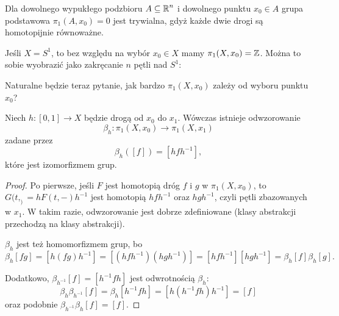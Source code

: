 \begin{example}
  \item Dla dowolnego wypukłego podzbioru $A\subseteq\operatorname{\mathbb{R}}^n$ i dowolnego punktu $x_0\in A$ grupa podstawowa $\pi_1(A, x_0)=0$ jest trywialna, gdyż każde dwie drogi są homotopijnie równoważne.
  \item Jeśli $X=S^1$, to bez względu na wybór $x_0\in X$ mamy $\pi_1(X, x_0)=\operatorname{\mathbb{Z}}$. Można to sobie wyobrazić jako zakręcanie $n$ pętli nad $S^1$:
    \begin{center}
    \end{center}
\end{example}

Naturalne będzie teraz pytanie, jak bardzo $\pi_1(X, x_0)$ zależy od wyboru punktu $x_0$? 

\begin{lemma}\label{lemma:1.5}
  Niech $h:[0,1]\to X$ będzie drogą od $x_0$ do $x_1$. Wówczas istnieje odwzorowanie 
  $$\beta_h:\pi_1(X, x_0)\to \pi_1(X, x_1)$$
  zadane przez 
  $$\beta_h([f])=[hfh^{-1}],$$
  które jest izomorfizmem grup.
\end{lemma}

\begin{proof}
  Po pierwsze, jeśli $F$ jest homotopią dróg $f$ i $g$ w $\pi_1(X, x_0)$, to $G(t, _)=hF(t,-)h^{-1}$ jest homotopią $hfh^{-1}$ oraz $hgh^{-1}$, czyli pętli zbazowanych w $x_1$. W takim razie, odwzorowanie jest dobrze zdefiniowane (klasy abstrakcji przechodzą na klasy abstrakcji).

  $\beta_h$ jest też homomorfizmem grup, bo 
  $$\beta_h[fg]=[h(fg)h^{-1}]=[(hfh^{-1})(hgh^{-1})]=[hfh^{-1}][hgh^{-1}]=\beta_h[f]\beta_h[g].$$
  
  Dodatkowo, $\beta_{h^{-1}}[f]=[h^{-1}fh]$ jest odwrotnością $\beta_h$:
  $$\beta_h\beta_{h^{-1}}[f]=\beta_h[h^{-1}fh]=[h(h^{-1}fh)h^{-1}]=[f]$$
  oraz podobnie $\beta_{h^{-1}}\beta_h[f]=[f]$.
\end{proof}

